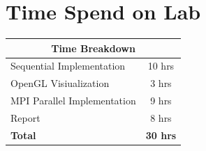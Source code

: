 \documentclass{article}
\begin{document}
\section{Time Spend on Lab}

\begin{center}
  \begin{tabular}{|l|c|}
    \hline
    \multicolumn{2}{|c|}{\bf Time Breakdown} \\ \hline
    Sequential Implementation & 10 hrs      \\ \hline
    OpenGL Visiualization     &  3 hrs      \\ \hline
    MPI Parallel Implementation & 9 hrs     \\ \hline
    Report & 8 hrs                          \\ \hline
    \bf{Total} & \bf{30 hrs}                \\ \hline
  \end{tabular}
\end{center}
\end{document}
